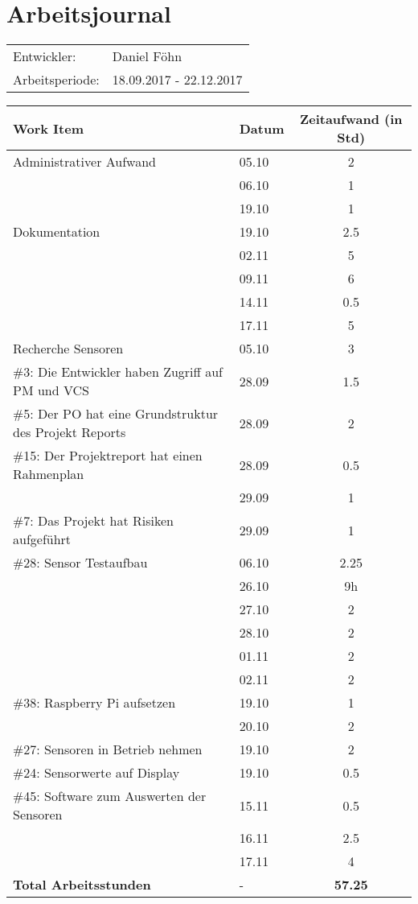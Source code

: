 \documentclass[a4paper, 10pt, fleqn]{article}
\newcommand{\header}{\textbf{Work Item}&\textbf{Datum}&\textbf{Zeitaufwand (in Std)}\\\toprule}
\newcommand{\footer}{\midrule\textbf{Total Arbeitsstunden}&-&\textbf{57.25}\\\midrule\bottomrule}
\begin{document}
	\section*{Arbeitsjournal}
    \begin{tabular}{ll}
        Entwickler: & Daniel Föhn \\
        Arbeitsperiode: & 18.09.2017 - 22.12.2017\\
    \end{tabular}

	\begin{table}[H]
		\centering
		\begin{tabular}{p{9cm}|p{2cm}|c}
            \header

            Administrativer Aufwand & 05.10 & 2\\
            & 06.10 & 1\\
            & 19.10 & 1\\
            
            Dokumentation & 19.10 & 2.5\\
            & 02.11 & 5\\
            & 09.11 & 6\\
            & 14.11 & 0.5\\
            & 17.11 & 5\\
            
            Recherche Sensoren & 05.10 & 3\\
            \#3: Die Entwickler haben Zugriff auf PM und VCS& 28.09 & 1.5\\
            \#5: Der PO hat eine Grundstruktur des Projekt Reports& 28.09 & 2\\
            \#15: Der Projektreport hat einen Rahmenplan & 28.09 & 0.5\\
            & 29.09 & 1\\
            \#7: Das Projekt hat Risiken aufgeführt & 29.09 & 1\\
            \#28: Sensor Testaufbau & 06.10 & 2.25\\
            & 26.10 & 9h \\
            & 27.10 & 2\\
            & 28.10 & 2\\
            & 01.11 & 2\\
            & 02.11 & 2\\
            \#38: Raspberry Pi aufsetzen & 19.10 & 1\\
            & 20.10 & 2\\
            \#27: Sensoren in Betrieb nehmen & 19.10 & 2\\
            \#24: Sensorwerte auf Display & 19.10 & 0.5\\
            \#45: Software zum Auswerten der Sensoren & 15.11 & 0.5\\
            & 16.11 & 2.5\\
            & 17.11 & 4\\
            \footer
		\end{tabular}
	\end{table}
\end{document}
